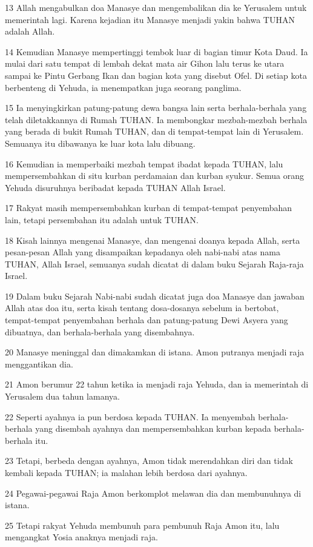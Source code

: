 \par 13 Allah mengabulkan doa Manasye dan mengembalikan dia ke Yerusalem untuk memerintah lagi. Karena kejadian itu Manasye menjadi yakin bahwa TUHAN adalah Allah.
\par 14 Kemudian Manasye mempertinggi tembok luar di bagian timur Kota Daud. Ia mulai dari satu tempat di lembah dekat mata air Gihon lalu terus ke utara sampai ke Pintu Gerbang Ikan dan bagian kota yang disebut Ofel. Di setiap kota berbenteng di Yehuda, ia menempatkan juga seorang panglima.
\par 15 Ia menyingkirkan patung-patung dewa bangsa lain serta berhala-berhala yang telah diletakkannya di Rumah TUHAN. Ia membongkar mezbah-mezbah berhala yang berada di bukit Rumah TUHAN, dan di tempat-tempat lain di Yerusalem. Semuanya itu dibawanya ke luar kota lalu dibuang.
\par 16 Kemudian ia memperbaiki mezbah tempat ibadat kepada TUHAN, lalu mempersembahkan di situ kurban perdamaian dan kurban syukur. Semua orang Yehuda disuruhnya beribadat kepada TUHAN Allah Israel.
\par 17 Rakyat masih mempersembahkan kurban di tempat-tempat penyembahan lain, tetapi persembahan itu adalah untuk TUHAN.
\par 18 Kisah lainnya mengenai Manasye, dan mengenai doanya kepada Allah, serta pesan-pesan Allah yang disampaikan kepadanya oleh nabi-nabi atas nama TUHAN, Allah Israel, semuanya sudah dicatat di dalam buku Sejarah Raja-raja Israel.
\par 19 Dalam buku Sejarah Nabi-nabi sudah dicatat juga doa Manasye dan jawaban Allah atas doa itu, serta kisah tentang dosa-dosanya sebelum ia bertobat, tempat-tempat penyembahan berhala dan patung-patung Dewi Asyera yang dibuatnya, dan berhala-berhala yang disembahnya.
\par 20 Manasye meninggal dan dimakamkan di istana. Amon putranya menjadi raja menggantikan dia.
\par 21 Amon berumur 22 tahun ketika ia menjadi raja Yehuda, dan ia memerintah di Yerusalem dua tahun lamanya.
\par 22 Seperti ayahnya ia pun berdosa kepada TUHAN. Ia menyembah berhala-berhala yang disembah ayahnya dan mempersembahkan kurban kepada berhala-berhala itu.
\par 23 Tetapi, berbeda dengan ayahnya, Amon tidak merendahkan diri dan tidak kembali kepada TUHAN; ia malahan lebih berdosa dari ayahnya.
\par 24 Pegawai-pegawai Raja Amon berkomplot melawan dia dan membunuhnya di istana.
\par 25 Tetapi rakyat Yehuda membunuh para pembunuh Raja Amon itu, lalu mengangkat Yosia anaknya menjadi raja.

